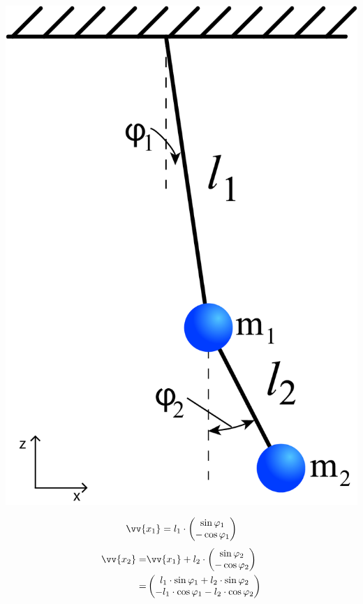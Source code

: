 \documentclass[compress,11pt]{beamer}
\begin{document}
\begin{frame}

	\begin{minipage}{.48\textwidth}
	\includegraphics[width=\textwidth]{images/4/double-pendulum}
	\end{minipage}
	\begin{minipage}{.48\textwidth}
	\begin{block}{}
		\begin{equation}
			\vv{x_1}= l_1\cdot\begin{pmatrix}
			\sin \varphi_1 \\ -\cos \varphi_1
			\end{pmatrix}
		\end{equation}
		\begin{align}
			\vv{x_2}=& \vv{x_1} + l_2 \cdot \begin{pmatrix}
			\sin \varphi_2 \\ -\cos \varphi_2
			\end{pmatrix}
			\\=& \begin{pmatrix}
			l_1 \cdot \sin \varphi_1 + l_2 \cdot \sin \varphi_2 \\ - l_1 \cdot \cos \varphi_1 - l_2 \cdot \cos \varphi_2 \nonumber
			\end{pmatrix}
		\end{align}
	\end{block}
	\end{minipage}
\end{frame}
\end{document}
